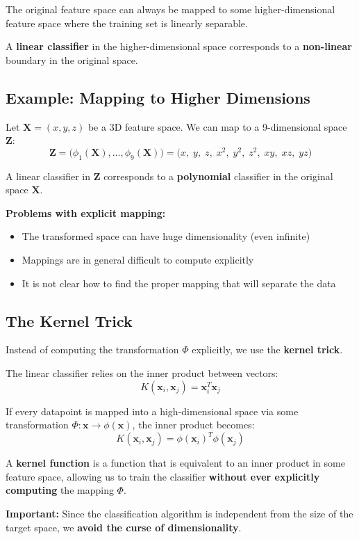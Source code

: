 \documentclass[11pt,a4paper]{article}
\theoremstyle{definition}
\theoremstyle{plain}
\theoremstyle{remark}
\begin{document}
\begin{tcolorbox}[colback=blue!5!white,colframe=blue!75!black,title=\textbf{Non-Linear SVM --- Core Idea}]
The original feature space can always be mapped to some higher-dimensional feature space where the training set is linearly separable.

A \textbf{linear classifier} in the higher-dimensional space corresponds to a \textbf{non-linear} boundary in the original space.
\end{tcolorbox}

\subsection{Example: Mapping to Higher Dimensions}

Let $\mathbf{X} = (x, y, z)$ be a 3D feature space. We can map to a 9-dimensional space $\mathbf{Z}$:
\[
\mathbf{Z} = \big(\phi_1(\mathbf{X}), \ldots, \phi_9(\mathbf{X})\big) = \big(x, \; y, \; z, \; x^2, \; y^2, \; z^2, \; xy, \; xz, \; yz\big)
\]

A linear classifier in $\mathbf{Z}$ corresponds to a \textbf{polynomial} classifier in the original space $\mathbf{X}$.

\textbf{Problems with explicit mapping:}
\begin{itemize}
    \item The transformed space can have huge dimensionality (even infinite)
    \item Mappings are in general difficult to compute explicitly
    \item It is not clear how to find the proper mapping that will separate the data
\end{itemize}

\subsection{The Kernel Trick}

Instead of computing the transformation $\Phi$ explicitly, we use the \textbf{kernel trick}.

\begin{tcolorbox}[colback=green!5!white,colframe=green!75!black,title=\textbf{The Kernel Trick}]
The linear classifier relies on the inner product between vectors:
\[
K(\mathbf{x}_i, \mathbf{x}_j) = \mathbf{x}_i^T \mathbf{x}_j
\]

If every datapoint is mapped into a high-dimensional space via some transformation $\Phi: \mathbf{x} \to \phi(\mathbf{x})$, the inner product becomes:
\[
K(\mathbf{x}_i, \mathbf{x}_j) = \phi(\mathbf{x}_i)^T \phi(\mathbf{x}_j)
\]

A \textbf{kernel function} is a function that is equivalent to an inner product in some feature space, allowing us to train the classifier \textbf{without ever explicitly computing} the mapping $\Phi$.

\textbf{Important:} Since the classification algorithm is independent from the size of the target space, we \textbf{avoid the curse of dimensionality}.
\end{tcolorbox}
\end{document}
